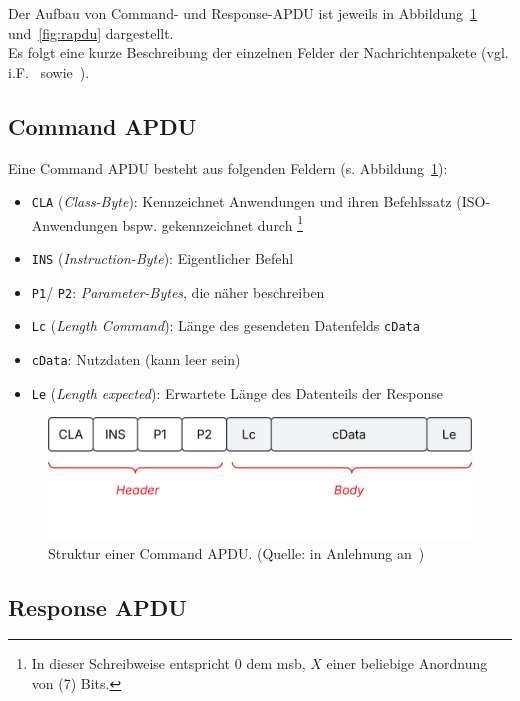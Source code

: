 \noindent
Der Aufbau von Command- und Response-APDU ist jeweils in Abbildung~\ref{fig:capdu} und~\ref{fig:rapdu} dargestellt.\\
Es folgt eine kurze Beschreibung der einzelnen Felder der Nachrichtenpakete (vgl. i.F.~\cite[23 ff.]{ITS5} sowie~\cite[430 ff.]{RF02}).

\subsection*{Command APDU}

Eine Command APDU besteht aus folgenden Feldern (s. Abbildung~\ref{fig:capdu}):

\begin{itemize}
    \itemsep0.5em
    \item \texttt{CLA} (\textit{Class-Byte}): Kennzeichnet Anwendungen und ihren Befehlssatz (ISO-Anwendungen bspw. gekennzeichnet durch \footnote{
    In dieser Schreibweise entspricht $0$ dem msb, $X$ einer beliebige Anordnung von (7) Bits.
    }
    \item \texttt{INS} (\textit{Instruction-Byte}): Eigentlicher Befehl
    \item \texttt{P1}/ \texttt{P2}: \textit{Parameter-Bytes}, die  näher beschreiben
    \item \texttt{Lc} (\textit{Length Command}): Länge des gesendeten Datenfelds \texttt{cData}
    \item \texttt{cData}: Nutzdaten (kann leer sein)
    \item \texttt{Le} (\textit{Length expected}): Erwartete Länge des Datenteils der Response
 \end{itemize}

\begin{figure}
    \centering
    \includegraphics[scale=0.4]{aufgabe 1/img/capdu.svg}
    \caption{Struktur einer Command APDU. (Quelle: in Anlehnung an~\cite[\textbf{Abb 2.5}, 23]{ITS5})}
    \label{fig:capdu}
\end{figure}


\subsection*{Response APDU}

